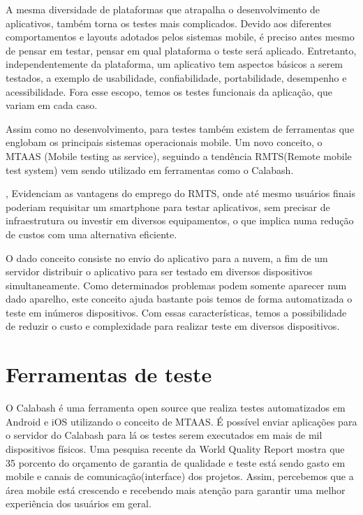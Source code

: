 A mesma diversidade de plataformas que atrapalha o desenvolvimento de aplicativos, também torna os testes mais complicados. Devido aos diferentes comportamentos e layouts adotados pelos sistemas mobile, é preciso antes mesmo de pensar em testar, pensar em qual plataforma o teste será aplicado. Entretanto, independentemente da plataforma, um aplicativo tem aspectos básicos a serem testados, a exemplo de usabilidade, confiabilidade, portabilidade, desempenho e acessibilidade. Fora esse escopo, temos os testes funcionais da aplicação, que variam em cada caso.


Assim como no desenvolvimento, para testes também existem de ferramentas que englobam os principais sistemas operacionais mobile. Um novo conceito, o  MTAAS (Mobile testing as service), seguindo a tendência RMTS(Remote mobile test system) vem sendo utilizado em ferramentas como o Calabash.


\cite{Huang-2012}, Evidenciam as vantagens do emprego do RMTS, onde até mesmo usuários finais poderiam requisitar um smartphone para testar aplicativos, sem precisar de infraestrutura ou investir em diversos equipamentos, o que implica numa redução de custos com uma alternativa eficiente. 


O dado conceito consiste no envio do aplicativo para a nuvem, a fim de um servidor distribuir o aplicativo para ser testado em diversos dispositivos simultaneamente. Como determinados problemas podem somente aparecer num dado aparelho, este conceito ajuda bastante pois temos de forma automatizada o teste em inúmeros dispositivos. Com essas características, temos a possibilidade de reduzir o custo e complexidade para realizar teste em diversos dispositivos.


\section{Ferramentas de teste}

O Calabash é uma ferramenta open source que realiza testes automatizados em Android e iOS utilizando o conceito de MTAAS. É possível enviar aplicações para o servidor do Calabash para lá os testes serem executados em mais de mil dispositivos físicos. 
Uma pesquisa recente da World Quality Report mostra que 35 porcento do orçamento de garantia de qualidade e teste está sendo gasto em mobile e canais de comunicação(interface) dos projetos. Assim, percebemos que a área mobile está crescendo e recebendo mais atenção para garantir uma melhor experiência dos usuários em geral.